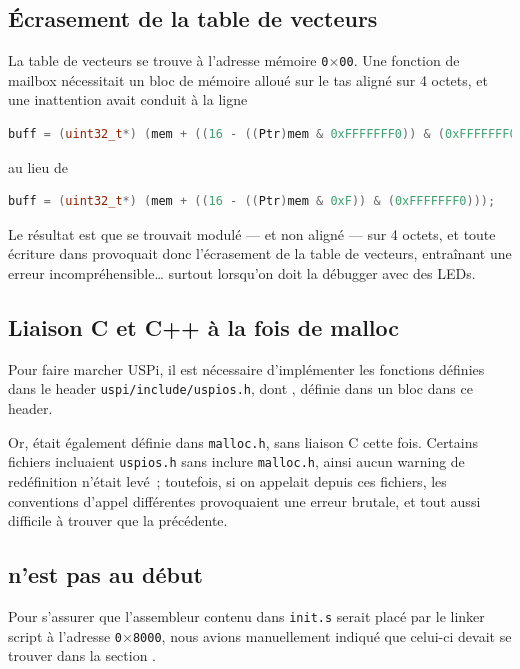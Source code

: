 \documentclass[11pt,a4paper]{article}
\newcommand{\hex}[1]{\texttt{0$\times$#1}}
\newcommand{\fname}[1]{\texttt{#1}} %
\begin{document}
\subsection*{Écrasement de la table de vecteurs}
La table de vecteurs se trouve à l'adresse mémoire \hex{00}. Une fonction de
mailbox nécessitait un bloc de mémoire alloué sur le tas aligné sur 4 octets,
et une inattention avait conduit à la ligne
\begin{lstlisting}[language=C++]
buff = (uint32_t*) (mem + ((16 - ((Ptr)mem & 0xFFFFFFF0)) & (0xFFFFFFF0)));
\end{lstlisting}

au lieu de
\begin{lstlisting}[language=C++]
buff = (uint32_t*) (mem + ((16 - ((Ptr)mem & 0xF)) & (0xFFFFFFF0)));
\end{lstlisting}

Le résultat est que  se trouvait modulé --- et non aligné --- sur 4
octets, et toute écriture dans  provoquait donc l'écrasement de la
table de vecteurs, entraînant une erreur incompréhensible\ldots{} surtout
lorsqu'on doit la débugger avec des LEDs.


\subsection*{Liaison C et C++ à la fois de malloc}
Pour faire marcher USPi, il est nécessaire d'implémenter les fonctions
définies dans le header \fname{uspi/include/uspios.h}, dont ,
définie dans un bloc  dans ce header. %

Or,  était également définie dans \fname{malloc.h}, sans liaison
C cette fois. Certains fichiers incluaient \fname{uspios.h} sans inclure
\fname{malloc.h}, ainsi aucun warning de redéfinition n'était levé~; toutefois,
si on appelait  depuis ces fichiers, les conventions d'appel
différentes provoquaient une erreur brutale, et tout aussi difficile à
trouver que la précédente.

\subsection*{ n'est pas au début}
Pour s'assurer que l'assembleur contenu dans \fname{init.s} serait placé par
le linker script à l'adresse \hex{8000}, nous avions manuellement indiqué
que celui-ci devait se trouver dans la section .
\end{document}
